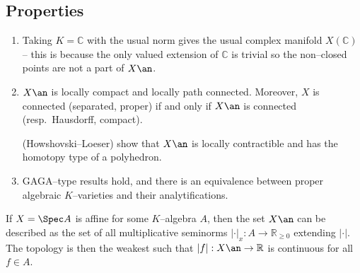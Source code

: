 \subsection{Properties}
\begin{enumerate}[start=0]
\item Taking \(K=\mathbb{C}\) with the usual norm gives the usual complex
manifold \(X(\mathbb{C})\)-- this is because the only valued extension of
\(\mathbb{C}\) is trivial so the non--closed points are not a part of \(X\an\).

\item \(X\an\) is locally  compact and locally path connected. Moreover, \(X\)
is connected (separated, proper) if and only if \(X\an\) is connected (resp.\
Hausdorff, compact).

(Howshovski--Loeser) show that \(X\an\) is locally contractible and has the
homotopy type of a polyhedron.

\item GAGA--type results hold, and there is an equivalence between proper
algebraic \(K\)--varieties and their analytifications.
\end{enumerate}

\begin{example}
If \(X=\Spec A\) is affine for some \(K\)--algebra \(A\), then the set \(X\an\)
can be described as the set of all multiplicative seminorms \(|\cdot |_x:A\to
\mathbb{R}_{\geq 0}\) extending \(|\cdot|\). The topology is then the weakest
such that \(|f|:X\an\to \mathbb{R}\) is continuous for all \(f\in A\).
\end{example}


